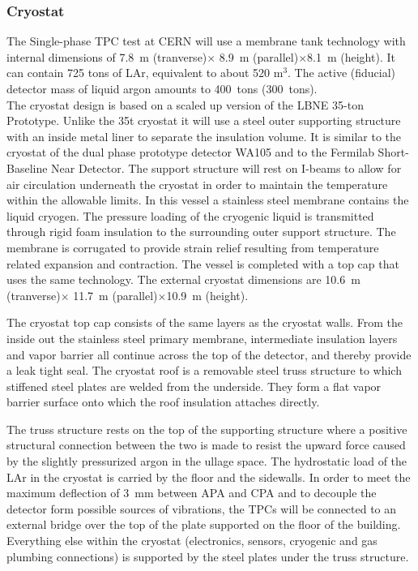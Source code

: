 \subsubsection{Cryostat}

The Single-phase TPC test at CERN will use a membrane tank technology with internal dimensions of
7.8~m (tranverse)$\times$ 8.9~m (parallel)$\times$8.1~m (height).
It can contain  725 tons of LAr, equivalent to about 520 m$^3$. The active (fiducial) detector mass of liquid argon amounts to 400~tons (300~tons).\\
The cryostat design is based on a scaled up version of the LBNE 35-ton Prototype\cite{montanari_35ton}.
Unlike the 35t cryostat it will use a steel outer supporting structure with an inside metal liner to separate the insulation volume. It is similar to the cryostat of the dual phase prototype detector WA105 and to the Fermilab Short-Baseline Near Detector. The support structure will rest on I-beams to allow for air circulation underneath the cryostat in order to maintain the temperature within the allowable limits.
In this vessel a stainless steel membrane contains the liquid cryogen. The pressure loading of the cryogenic liquid is transmitted through rigid foam insulation to the surrounding outer support structure. The membrane is corrugated to provide strain relief resulting from temperature related expansion and contraction. The vessel is completed with a top cap that uses the same technology.
The external cryostat dimensions are 10.6~m (tranverse)$\times$ 11.7~m (parallel)$\times$10.9~m (height).


The cryostat top cap consists of the same layers as the cryostat walls. From the inside out
the stainless steel primary membrane, intermediate insulation layers and vapor barrier all continue across
the top of the detector, and thereby provide a leak tight seal.
The cryostat roof is a removable steel truss structure
to which stiffened steel plates are welded from the
underside. They form a flat vapor barrier surface onto which the roof insulation attaches directly.

The truss structure rests on the top of the supporting structure where a positive structural connection
between the two is made to resist the upward force caused by the slightly pressurized argon in the ullage
space. The hydrostatic load of the LAr in the cryostat is carried by the floor and the sidewalls. In order to meet the maximum deflection of 3~mm between APA and CPA and to decouple the detector form possible sources of vibrations, the TPCs will be connected to an external bridge over the top of the plate supported on the floor of the building. Everything else within the cryostat
(electronics, sensors, cryogenic and gas plumbing connections) is
supported by the steel plates under the truss structure.

